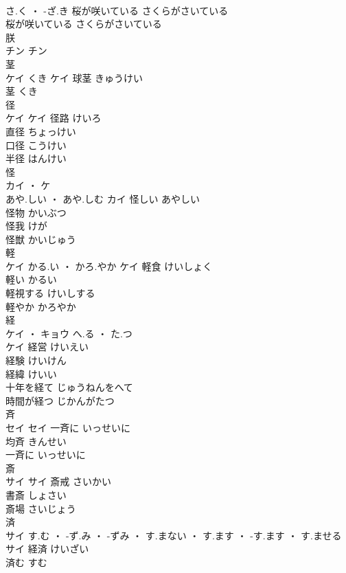 \documentclass[8pt]{extreport}
\begin{document}
\begin{CJK}{UTF8}{min}
\\	さ.く ・ -ざ.き		桜が咲いている	さくらがさいている	
\\	桜が咲いている	さくらがさいている	
\\	朕	
\\	チン		チン																																			
\\	茎	
\\	ケイ	くき	ケイ	球茎	きゅうけい	
\\	茎	くき	
\\	径	
\\	ケイ		ケイ	径路	けいろ	
\\	直径	ちょっけい	
\\	口径	こうけい	
\\	半径	はんけい	
\\	怪	
\\	カイ ・ ケ
\\	あや.しい ・ あや.しむ	カイ	怪しい	あやしい	
\\	怪物	かいぶつ	
\\	怪我	けが	
\\	怪獣	かいじゅう	
\\	軽	
\\	ケイ	かる.い ・ かろ.やか	ケイ	軽食	けいしょく	
\\	軽い	かるい	
\\	軽視する	けいしする	
\\	軽やか	かろやか	
\\	経	
\\	ケイ ・ キョウ	へ.る ・ た.つ
\\	ケイ	経営	けいえい	
\\	経験	けいけん	
\\	経緯	けいい	
\\	十年を経て	じゅうねんをへて	
\\	時間が経つ	じかんがたつ	
\\	斉	
\\	セイ		セイ	一斉に	いっせいに	
\\	均斉	きんせい	
\\	一斉に	いっせいに	
\\	斎	
\\	サイ		サイ	斎戒	さいかい	
\\	書斎	しょさい	
\\	斎場	さいじょう	
\\	済	
\\	サイ	す.む ・ -ず.み ・ -ずみ ・ す.まない ・ す.ます ・ -す.ます ・ す.ませる	サイ	経済	けいざい	
\\	済む	すむ	

\end{CJK}
\end{document}
